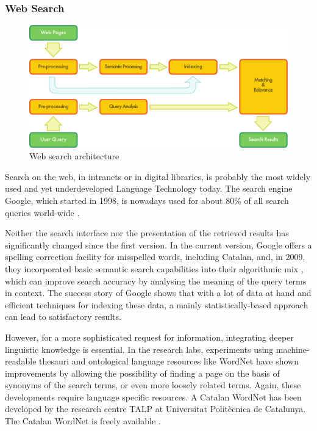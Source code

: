 \begin{multicols}{2}
\subsubsection{Web Search}

\begin{figure}[htb]
  \center
  \includegraphics[width=\textwidth]{../_media/english/web_search_architecture}
  \caption{Web search architecture}
  \label{fig:websearcharch_en}
 \end{figure}

Search on the web, in intranets or in digital libraries, is probably the most widely used and yet underdeveloped Language Technology today. The search engine Google, which started in 1998, is nowadays used for about 80\% of all search queries world-wide \cite{CAT-Nota22}. 

Neither the search interface nor the presentation of the retrieved results has significantly changed since the first version. In the current version, Google offers a spelling correction facility for misspelled words, including Catalan, and, in 2009, they incorporated basic semantic search capabilities into their algorithmic mix \cite{CAT-Nota23}, which can improve search accuracy by analysing the meaning of the query terms in context. The success story of Google shows that with a lot of data at hand and efficient techniques for indexing these data, a mainly statistically-based approach can lead to satisfactory results. 

However, for a more sophisticated request for information, integrating deeper linguistic knowledge is essential. In the research labs, experiments using machine-readable thesauri and ontological language resources like WordNet have shown improvements by allowing the possibility of finding a page on the basis of synonyms of the search terms, or even more loosely related terms. Again, these developments require language specific resources. A Catalan WordNet has been developed by the research centre TALP at Universitat Politècnica de Catalunya. The Catalan WordNet is freely available \cite{CAT-Nota24}.


\end{multicols}
